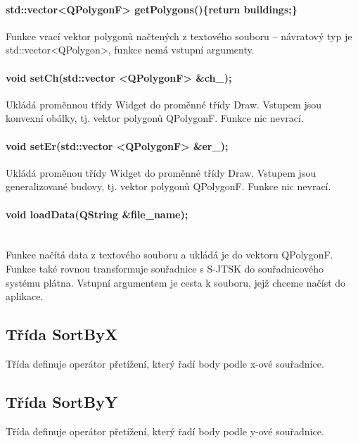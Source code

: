 \documentclass[11pt]{article}
\begin{document}
 	\paragraph{std::vector<QPolygonF> getPolygons()\{return buildings;\}}
 	
 	Funkce vrací vektor polygonů načtených z textového souboru – návratový typ je std::vector<QPolygon>, funkce nemá vstupní argumenty.
 	
	\paragraph{void setCh(std::vector <QPolygonF> \&ch\_);}
	Ukládá proměnnou třídy Widget do proměnné třídy Draw. Vstupem jsou konvexní obálky, tj. vektor polygonů QPolygonF. Funkce nic nevrací.
	
	\paragraph{void setEr(std::vector <QPolygonF> \&er\_);                                                                                                                                                                                                                                                                             }
	Ukládá proměnou třídy Widget do proměnné třídy Draw. Vstupem jsou generalizované budovy, tj. vektor polygonů QPolygonF. Funkce nic nevrací.
 	
 	\paragraph{void loadData(QString \&file\_name);}\mbox{}\\
 	Funkce načítá data z textového souboru a ukládá je do vektoru QPolygonF. Funkce také rovnou transformuje souřadnice s S-JTSK do souřadnicového systému plátna. Vstupní argumentem je cesta k souboru, jejž chceme načíst do aplikace.   
 	
 	\subsection{Třída SortByX}
 	Třída definuje operátor přetížení, který řadí body podle x-ové souřadnice.
 	
 	\subsection{Třída SortByY}
 	Třída definuje operátor přetížení, který řadí body podle y-ové souřadnice.
 	
\end{document}
